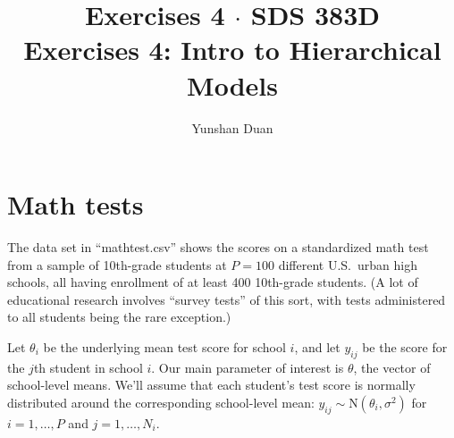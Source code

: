 \documentclass[11pt]{article}
\title{Exercises 4 $\cdot$ SDS 383D \\ Exercises 4: Intro to Hierarchical Models}
\author{Yunshan Duan }
\date{}  %
\begin{document}
\maketitle%


\section{Math tests}

The data set in ``mathtest.csv'' shows the scores on a standardized math test from a sample of 10th-grade students at $P=100$ different U.S.~urban high schools, all having enrollment of at least 400 10th-grade students.  (A lot of educational research involves ``survey tests'' of this sort, with tests administered to all students being the rare exception.)

Let $\theta_i$ be the underlying mean test score for school $i$, and let $y_{ij}$ be the score for the $j$th student in school $i$.  Our main parameter of interest is $\theta$, the vector of school-level means.  We'll assume that each student's test score is normally distributed around the corresponding school-level mean: $y_{ij} \sim \mbox{N}(\theta_i, \sigma^2)$ for $i=1, \ldots, P$ and $j = 1, \ldots, N_i$.  
\end{document}
